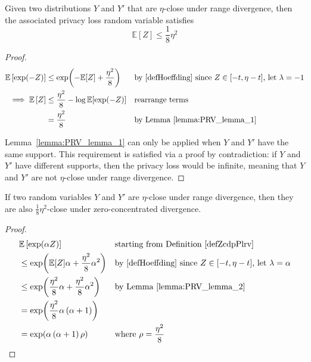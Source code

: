 \documentclass{article}
\begin{document}
\begin{lemma} 
    Given two distributions $Y$ and $Y'$ that are $\eta$-close under range divergence,
    then the associated privacy loss random variable satisfies
    \label{lemma:PRV_lemma_2}
    \begin{equation}
        \mathbb{E}\left[Z\right] \leq \frac{1}{8}\eta^2
    \end{equation}
\end{lemma}

\begin{proof}
\begin{align}
    \mathbb{E}\left[\exp(-Z)\right] & \leq \exp(-\mathbb{E}[Z] + \frac{\eta^2}{8}) && \text{by \ref{defHoeffding} since } Z \in [-t, \eta - t] \text{, let } \lambda = -1 \\
    \implies \mathbb{E}\left[Z\right] & \leq \frac{\eta^2}{8} - \log{\mathbb{E}[\exp(-Z)]} && \text{rearrange terms} \\
    & = \frac{\eta^2}{8} && \text{by Lemma~\ref{lemma:PRV_lemma_1}}
\end{align}

Lemma~\ref{lemma:PRV_lemma_1} can only be applied when $Y$ and $Y'$ have the same support.
This requirement is satisfied via a proof by contradiction: if $Y$ and $Y'$ have different supports, 
then the privacy loss would be infinite,
meaning that $Y$ and $Y'$ are not $\eta$-close under range divergence.
\end{proof}


\begin{theorem}
    \label{thm:br_to_zcdp}
    If two random variables $Y$ and $Y'$ are $\eta$-close under range divergence,
    then they are also $\frac{1}{8}\eta^2$-close under zero-concentrated divergence.
\end{theorem}

\begin{proof}
\begin{align}
    & \mathbb{E}\left[\exp(\alpha Z)\right] && \text{starting from Definition~\ref{defZcdpPlrv}}\\
    & \leq \exp(\mathbb{E}[Z] \alpha + \frac{\eta^2}{8} \alpha^2) && \text{by \ref{defHoeffding} since } Z \in [-t, \eta - t] \text{, let } \lambda = \alpha \\
    & \leq \exp(\frac{\eta^2}{8} \alpha + \frac{\eta^2}{8} \alpha^2) && \text{by Lemma~\ref{lemma:PRV_lemma_2}} \\
    & = \exp(\frac{\eta^2}{8} \alpha \left( \alpha + 1\right)) \\
    & = \exp(\alpha \left( \alpha + 1\right) \rho) && \text{where } \rho = \frac{\eta^2}{8}
\end{align}
\end{proof}
\end{document}
